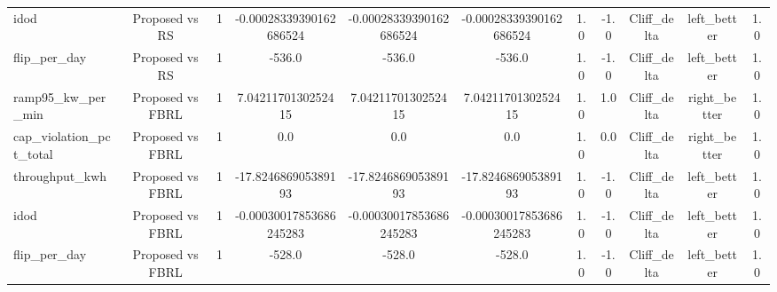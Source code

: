 \begin{table}[t]
\begin{tabular}{lcccccccccc}
idod & Proposed vs RS & 1 & -0.00028339390162686524 & -0.00028339390162686524 & -0.00028339390162686524 & 1.0 & -1.0 & Cliff\_delta & left\_better & 1.0 \\
flip\_per\_day & Proposed vs RS & 1 & -536.0 & -536.0 & -536.0 & 1.0 & -1.0 & Cliff\_delta & left\_better & 1.0 \\
ramp95\_kw\_per\_min & Proposed vs FBRL & 1 & 7.0421170130252415 & 7.0421170130252415 & 7.0421170130252415 & 1.0 & 1.0 & Cliff\_delta & right\_better & 1.0 \\
cap\_violation\_pct\_total & Proposed vs FBRL & 1 & 0.0 & 0.0 & 0.0 & 1.0 & 0.0 & Cliff\_delta & right\_better & 1.0 \\
throughput\_kwh & Proposed vs FBRL & 1 & -17.824686905389193 & -17.824686905389193 & -17.824686905389193 & 1.0 & -1.0 & Cliff\_delta & left\_better & 1.0 \\
idod & Proposed vs FBRL & 1 & -0.00030017853686245283 & -0.00030017853686245283 & -0.00030017853686245283 & 1.0 & -1.0 & Cliff\_delta & left\_better & 1.0 \\
flip\_per\_day & Proposed vs FBRL & 1 & -528.0 & -528.0 & -528.0 & 1.0 & -1.0 & Cliff\_delta & left\_better & 1.0 \\
\bottomrule
\end{tabular}
\end{table}